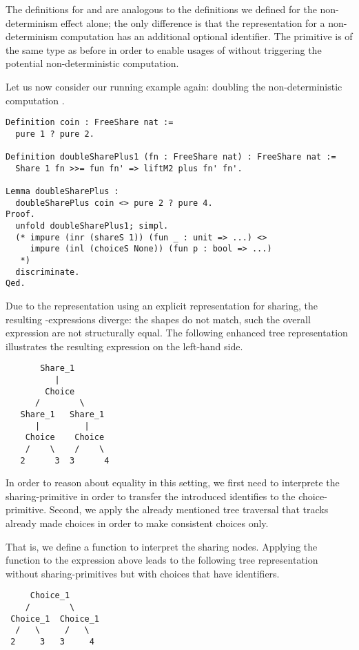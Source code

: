 The definitions for  and  are analogous to the definitions we defined for the non-determinism effect alone; the only difference is that the representation for a non-determinism computation has an additional optional identifier.
The  primitive is of the same type as before in order to enable usages of \cinl{>>=} without triggering the potential non-deterministic computation.

Let us now consider our running example again: doubling the non-deterministic computation .

\begin{verbatim}
Definition coin : FreeShare nat :=
  pure 1 ? pure 2.

Definition doubleSharePlus1 (fn : FreeShare nat) : FreeShare nat :=
  Share 1 fn >>= fun fn' => liftM2 plus fn' fn'.

Lemma doubleSharePlus :
  doubleSharePlus coin <> pure 2 ? pure 4.
Proof.
  unfold doubleSharePlus1; simpl.
  (* impure (inr (shareS 1)) (fun _ : unit => ...) <>
     impure (inl (choiceS None)) (fun p : bool => ...)
   *)
  discriminate.
Qed.
\end{verbatim}

Due to the representation using an explicit representation for sharing, the resulting -expressions diverge: the shapes do not match, such the overall expression are not structurally equal.
The following enhanced tree representation illustrates the resulting expression on the left-hand side.

\begin{verbatim}
       Share_1
          |      
        Choice
      /        \
   Share_1   Share_1
      |         |
    Choice    Choice
    /    \    /    \
   2      3  3      4
\end{verbatim}

In order to reason about equality in this setting, we first need to interprete the sharing-primitive in order to transfer the introduced identifies to the choice-primitive.
Second, we apply the already mentioned tree traversal that tracks already made choices in order to make consistent choices only.

That is, we define a function \cinl{numberChoices : FreeShareND A -> FreeND A} to interpret the sharing nodes.
Applying the function to the expression above leads to the following tree representation without sharing-primitives but with choices that have identifiers.

\begin{verbatim}
     Choice_1
    /        \
 Choice_1  Choice_1
  /   \     /   \
 2     3   3     4
\end{verbatim}

